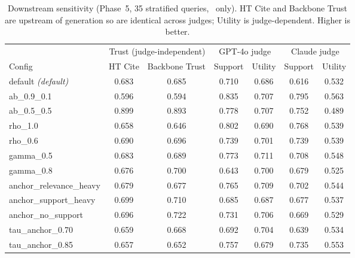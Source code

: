 \begin{table}[t]
\centering\small
\caption{Downstream sensitivity (Phase~5, 35 stratified queries, \anchorrag\ only). HT Cite and Backbone Trust are upstream of generation so are identical across judges; Utility is judge-dependent. Higher is better.}
\label{tab:appendix-phase5}
\begin{tabular}{lcccccc}
\toprule
 & \multicolumn{2}{c}{Trust (judge-independent)} & \multicolumn{2}{c}{GPT-4o judge} & \multicolumn{2}{c}{Claude judge} \\
\cmidrule(lr){2-3}\cmidrule(lr){4-5}\cmidrule(lr){6-7}
Config & HT Cite & Backbone Trust & Support & Utility & Support & Utility \\
\midrule
default \emph{(default)} & 0.683 & 0.685 & 0.710 & 0.686 & 0.616 & 0.532 \\
ab\_0.9\_0.1 & 0.596 & 0.594 & 0.835 & 0.707 & 0.795 & 0.563 \\
ab\_0.5\_0.5 & 0.899 & 0.893 & 0.778 & 0.707 & 0.752 & 0.489 \\
rho\_1.0 & 0.658 & 0.646 & 0.802 & 0.690 & 0.768 & 0.539 \\
rho\_0.6 & 0.690 & 0.696 & 0.739 & 0.701 & 0.739 & 0.539 \\
gamma\_0.5 & 0.683 & 0.689 & 0.773 & 0.711 & 0.708 & 0.548 \\
gamma\_0.8 & 0.676 & 0.700 & 0.643 & 0.700 & 0.679 & 0.525 \\
anchor\_relevance\_heavy & 0.679 & 0.677 & 0.765 & 0.709 & 0.702 & 0.544 \\
anchor\_support\_heavy & 0.699 & 0.710 & 0.685 & 0.687 & 0.677 & 0.537 \\
anchor\_no\_support & 0.696 & 0.722 & 0.731 & 0.706 & 0.669 & 0.529 \\
tau\_anchor\_0.70 & 0.659 & 0.668 & 0.692 & 0.704 & 0.639 & 0.534 \\
tau\_anchor\_0.85 & 0.657 & 0.652 & 0.757 & 0.679 & 0.735 & 0.553 \\
\bottomrule
\end{tabular}
\end{table}
